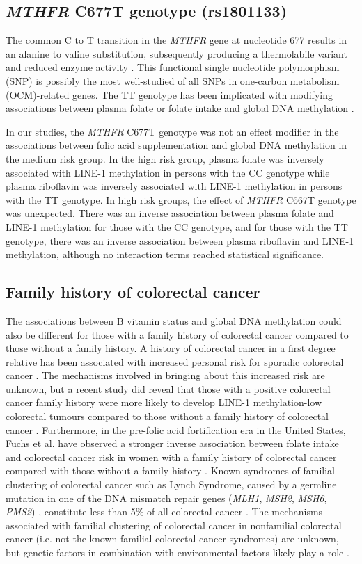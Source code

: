 \subsection{\emph{MTHFR} C677T genotype (rs1801133)} %
\noindent The common C to T transition in the \emph{MTHFR} gene at nucleotide 677 results in an alanine to valine substitution, subsequently producing a thermolabile variant and reduced enzyme activity \cite{c76}. This functional single nucleotide polymorphism (SNP) is possibly the most well-studied of all SNPs in one-carbon metabolism (OCM)-related genes. The TT genotype has been implicated with modifying associations between plasma folate or folate intake and global DNA methylation \cite{c75,c76,c712,c764,c765}. 
 
\noindent In our studies, the \emph{MTHFR} C677T genotype was not an effect modifier in the associations between folic acid supplementation and global DNA methylation in the medium risk group. In the high risk group, plasma folate was inversely associated with LINE-1 methylation in persons with the CC genotype while plasma riboflavin was inversely associated with LINE-1 methylation in persons with the TT genotype. In high risk groups, the effect of \emph{MTHFR} C667T genotype was unexpected. There was an inverse association between plasma folate and LINE-1 methylation for those with the CC genotype, and for those with the TT genotype, there was an inverse association between plasma riboflavin and LINE-1 methylation, although no interaction terms reached statistical significance. 
 
\subsection{Family history of colorectal cancer} %
\noindent The associations between B vitamin status and global DNA methylation could also be different for those with a family history of colorectal cancer compared to those without a family history. A history of colorectal cancer in a first degree relative has been associated with increased personal risk for sporadic colorectal cancer \cite{c766,c767}. The mechanisms involved in bringing about this increased risk are unknown, but a recent study did reveal that those with a positive colorectal cancer family history were more likely to develop LINE-1 methylation-low colorectal tumours compared to those without a family history of colorectal cancer \cite{c768}. Furthermore, in the pre-folic acid fortification era in the United States, Fuchs et al. have observed a stronger inverse association between folate intake and colorectal cancer risk in women with a family history of colorectal cancer compared with those without a family history \cite{c769}. Known syndromes of familial clustering of colorectal cancer 
such as Lynch Syndrome, caused by a germline mutation in one of the DNA mismatch repair genes (\emph{MLH1}, \emph{MSH2}, \emph{MSH6}, \emph{PMS2}) \cite{c770}, constitute less than 5\% of all colorectal cancer \cite{c771}. The mechanisms associated with familial clustering of colorectal cancer in nonfamilial colorectal cancer (i.e. not the known familial colorectal cancer syndromes) are unknown, but genetic factors in combination with environmental factors likely play a role \cite{c772}. 
 

